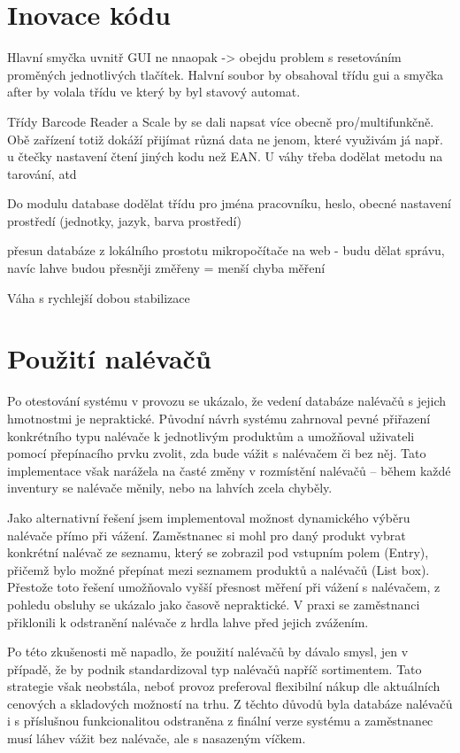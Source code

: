 \section{Inovace kódu}

Hlavní smyčka uvnitř GUI ne nnaopak -> obejdu problem s resetováním proměných jednotlivých tlačítek. Halvní soubor by obsahoval třídu gui a smyčka after by volala třídu ve který by byl stavový automat.

Třídy Barcode Reader a Scale by se dali napsat více obecně pro/multifunkčně. Obě zařízení totiž dokáží přijímat různá data ne jenom, které využivám já např. u čtečky nastavení čtení jiných kodu než EAN. U váhy třeba dodělat metodu na tarování, atd

Do modulu database dodělat třídu pro jména pracovníku, heslo, obecné nastavení prostředí (jednotky, jazyk, barva prostředí)

přesun databáze z lokálního prostotu mikropočítače na web - budu dělat správu, navíc lahve budou přesněji změřeny = menší chyba měření 

Váha s rychlejší dobou stabilizace

\section{Použití nalévačů}
Po otestování systému v provozu se ukázalo, že vedení databáze nalévačů s jejich hmotnostmi je nepraktické. Původní návrh systému zahrnoval pevné přiřazení konkrétního typu nalévače k jednotlivým produktům a umožňoval uživateli pomocí přepínacího prvku zvolit, zda bude vážit s nalévačem či bez něj. Tato implementace však narážela na časté změny v rozmístění nalévačů – během každé inventury se nalévače měnily, nebo na lahvích zcela chyběly.

Jako alternativní řešení jsem implementoval možnost dynamického výběru nalévače přímo při vážení. Zaměstnanec si mohl pro daný produkt vybrat konkrétní nalévač ze seznamu, který se zobrazil pod vstupním polem (Entry), přičemž bylo možné přepínat mezi seznamem produktů a nalévačů (List box). Přestože toto řešení umožňovalo vyšší přesnost měření při vážení s nalévačem, z pohledu obsluhy se ukázalo jako časově nepraktické. V praxi se zaměstnanci přiklonili k odstranění nalévače z hrdla lahve před jejich zvážením.

Po této zkušenosti mě napadlo, že použití nalévačů by dávalo smysl, jen v případě, že by podnik standardizoval typ nalévačů napříč sortimentem. Tato strategie však neobstála, neboť provoz preferoval flexibilní nákup dle aktuálních cenových a skladových možností na trhu. Z těchto důvodů byla databáze nalévačů i s příslušnou funkcionalitou odstraněna z finální verze systému a zaměstnanec musí láhev vážit bez nalévače, ale s nasazeným víčkem.